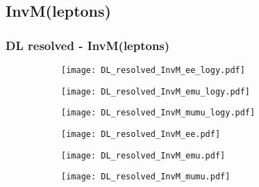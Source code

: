 \documentclass[aspectratio=169,8pt]{beamer}
\begin{document}
\subsection{InvM(leptons)}
\begin{frame}
\frametitle{DL resolved - InvM(leptons)}
\begin{figure}
\captionsetup[subfigure]{labelformat=empty}
\begin{subfigure}{0.32\textwidth}
\texttt{[image: DL\_resolved\_InvM\_ee\_logy.pdf]}
\vspace*{-0.15cm}
\end{subfigure}
\hfil
\begin{subfigure}{0.32\textwidth}
\texttt{[image: DL\_resolved\_InvM\_emu\_logy.pdf]}
\vspace*{-0.15cm}
\end{subfigure}
\hfil
\begin{subfigure}{0.32\textwidth}
\texttt{[image: DL\_resolved\_InvM\_mumu\_logy.pdf]}
\vspace*{-0.15cm}
\end{subfigure}
\hfil
\begin{subfigure}{0.32\textwidth}
\texttt{[image: DL\_resolved\_InvM\_ee.pdf]}
\vspace*{-0.15cm}
\end{subfigure}
\hfil
\begin{subfigure}{0.32\textwidth}
\texttt{[image: DL\_resolved\_InvM\_emu.pdf]}
\vspace*{-0.15cm}
\end{subfigure}
\hfil
\begin{subfigure}{0.32\textwidth}
\texttt{[image: DL\_resolved\_InvM\_mumu.pdf]}
\vspace*{-0.15cm}
\end{subfigure}
\hfil
\end{figure}
\end{frame}
\newpage
\end{document}
